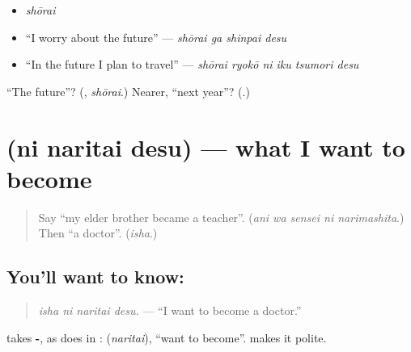 \begin{itemize}
\raggedright
  \item \emph{shōrai}
  \item \textquotedblleft{}I worry about the future\textquotedblright{} — \emph{shōrai ga shinpai desu}
  \item \textquotedblleft{}In the future I plan to travel\textquotedblright{} — \emph{shōrai ryokō ni iku tsumori desu}
\end{itemize}

\begin{tcolorbox}[breakable,colback=teal!4,colframe=teal!35!black,title={Before you move on}]
\textquotedblleft{}The future\textquotedblright{}? (\textbf{}, \emph{shōrai}.) Nearer, \textquotedblleft{}next year\textquotedblright{}? (\textbf{}.)
\end{tcolorbox}
\section[\texorpdfstring{\ja{〜}\ja{に} \ja{なりたいです} (ni naritai desu)}{〜に なりたいです (ni naritai desu)}]{  (ni naritai desu) — what I want to become}

\label{lesson:JA-C258-naritai}



\begin{quote}
Say \textquotedblleft{}my elder brother became a teacher\textquotedblright{}. (\emph{ani wa sensei ni narimashita}.) Then \textquotedblleft{}a doctor\textquotedblright{}. (\emph{isha}.)
\end{quote}

\subsection*{You'll want to know:  }
\begin{quote}
\textbf{ }
\end{quote}

\begin{quote}
\emph{isha ni naritai desu.} — \textquotedblleft{}I want to become a doctor.\textquotedblright{}
\end{quote}

\textbf{} takes \textbf{-}, as \textbf{} does in \textbf{}: \textbf{} (\emph{naritai}), \textquotedblleft{}want to become\textquotedblright{}. \textbf{} makes it polite.


